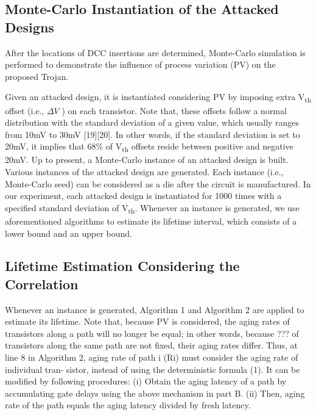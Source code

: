\subsection{Monte-Carlo Instantiation of the Attacked Designs}
After the locations of DCC insertions are determined, Monte-Carlo simulation is performed to demonstrate the influence of process variation (PV) on the proposed Trojan.

Given an attacked design, it is instantiated considering PV by imposing extra V\textsubscript{th} offset (i.e., $\Delta V$ ) on each transistor. Note that, these offsets follow a normal distribution with the standard deviation of a given value, which usually ranges from 10mV to 30mV [19][20]. In other words, if the standard deviation is set to 20mV, it implies that 68\% of V\textsubscript{th} offsets reside between positive and negative 20mV. Up to present, a Monte-Carlo instance of an attacked design is built.
Various instances of the attacked design are generated. Each instance (i.e., Monte-Carlo seed) can be considered as a die after the circuit is manufactured. In our experiment, each attacked design is instantiated for 1000 times with a specified standard deviation of V\textsubscript{th}. Whenever an instance is generated, we use aforementioned algorithms to estimate its lifetime interval, which consists of a lower bound and an upper bound.

\subsection{Lifetime Estimation Considering the Correlation}
Whenever an instance is generated, Algorithm 1 and Algorithm 2 are applied to estimate its lifetime. Note that, because PV is considered, the aging rates of transistors along a path will no longer be equal; in other words, because ??? of transistors along the same path are not fixed, their aging rates differ. Thus, at line 8 in Algorithm 2, aging rate of path i (Ri) must consider the aging rate of individual tran- sistor, instead of using the deterministic formula (1). It can be modified by following procedures: (i) Obtain the aging latency of a path by accumulating gate delays using the above mechanism in part B. (ii) Then, aging rate of the path equals the aging latency divided by fresh latency.

